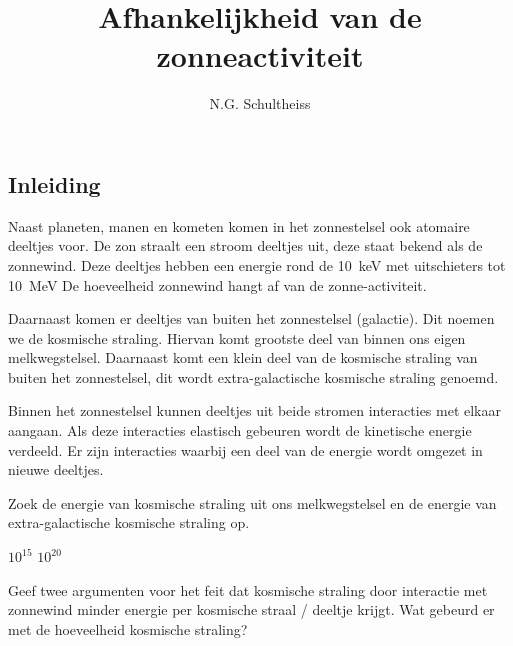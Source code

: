 


\title{Afhankelijkheid van de zonneactiviteit}
\author{N.G. Schultheiss}




\maketitle

\begin{questions}

\begin{EnvUplevel}
\section{Inleiding}

Naast planeten, manen en kometen komen in het zonnestelsel ook atomaire
deeltjes voor. De zon straalt een stroom deeltjes uit, deze staat bekend
als de zonnewind. Deze deeltjes hebben een energie rond de
\SI{10}{\kilo\eV} met uitschieters tot \SI{10}{\MeV} De hoeveelheid
zonnewind hangt af van de zonne-activiteit.

Daarnaast komen er deeltjes van buiten het zonnestelsel (galactie). Dit
noemen we de kosmische straling. Hiervan komt grootste deel van binnen ons
eigen melkwegstelsel. Daarnaast komt een klein deel van de kosmische
straling van buiten het zonnestelsel, dit wordt extra-galactische
kosmische straling genoemd.

Binnen het zonnestelsel kunnen deeltjes uit beide stromen interacties met
elkaar aangaan. Als deze interacties elastisch gebeuren wordt de
kinetische energie verdeeld. Er zijn interacties waarbij een deel van de
energie wordt omgezet in nieuwe deeltjes.
\end{EnvUplevel}

\question Zoek de energie van kosmische straling uit ons melkwegstelsel en
de energie van extra-galactische kosmische straling op.
\begin{solution}
  $10^{15}$ $10^{20}$
\end{solution}

\question Geef twee argumenten voor het feit dat kosmische straling door
interactie met zonnewind minder energie per kosmische straal / deeltje
krijgt. Wat gebeurd er met de hoeveelheid kosmische straling?
\end{questions}
